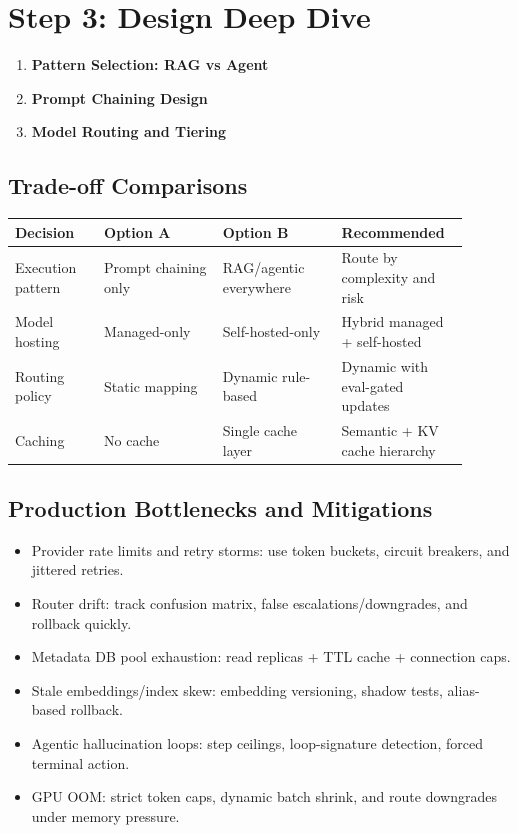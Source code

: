 \section*{Step 3: Design Deep Dive}
\begin{enumerate}
  \item \textbf{Pattern Selection: RAG vs Agent}
  \item \textbf{Prompt Chaining Design}
  \item \textbf{Model Routing and Tiering}
\end{enumerate}

\subsection*{Trade-off Comparisons}
\begin{tabular}{|p{0.18\linewidth}|p{0.24\linewidth}|p{0.24\linewidth}|p{0.24\linewidth}|}
\hline
\textbf{Decision} & \textbf{Option A} & \textbf{Option B} & \textbf{Recommended} \\
\hline
Execution pattern & Prompt chaining only & RAG/agentic everywhere & Route by complexity and risk \\
\hline
Model hosting & Managed-only & Self-hosted-only & Hybrid managed + self-hosted \\
\hline
Routing policy & Static mapping & Dynamic rule-based & Dynamic with eval-gated updates \\
\hline
Caching & No cache & Single cache layer & Semantic + KV cache hierarchy \\
\hline
\end{tabular}

\subsection*{Production Bottlenecks and Mitigations}
\begin{itemize}
  \item Provider rate limits and retry storms: use token buckets, circuit breakers, and jittered retries.
  \item Router drift: track confusion matrix, false escalations/downgrades, and rollback quickly.
  \item Metadata DB pool exhaustion: read replicas + TTL cache + connection caps.
  \item Stale embeddings/index skew: embedding versioning, shadow tests, alias-based rollback.
  \item Agentic hallucination loops: step ceilings, loop-signature detection, forced terminal action.
  \item GPU OOM: strict token caps, dynamic batch shrink, and route downgrades under memory pressure.
\end{itemize}

